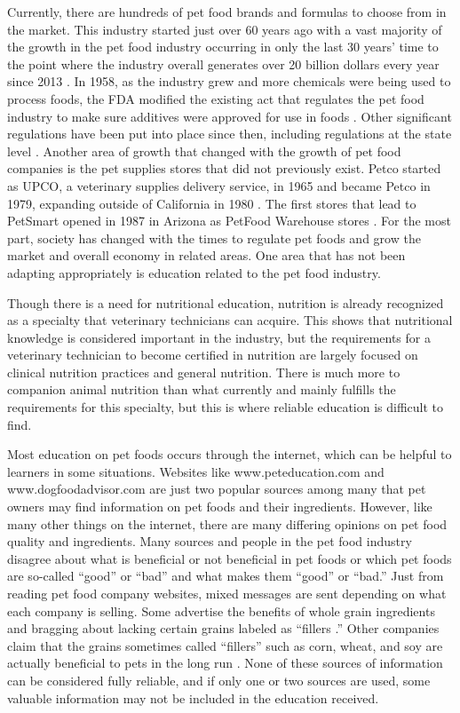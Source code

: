 Currently, there are hundreds of pet food brands and formulas to choose from in the market.  This industry started just over 60 years ago with a vast majority of the growth in the pet food industry occurring in only the last 30 years’ time to the point where the industry overall generates over 20 billion dollars every year since 2013 \citep{tudor,prweb}.  In 1958, as the industry grew and more chemicals were being used to process foods, the FDA modified the existing act that regulates the pet food industry to make sure additives were approved for use in foods \citep{fda}.  Other significant regulations have been put into place since then, including regulations at the state level \citep{fda,hillestad}.  Another area of growth that changed with the growth of pet food companies is the pet supplies stores that did not previously exist.  Petco started as UPCO, a veterinary supplies delivery service, in 1965 and became Petco in 1979, expanding outside of California in 1980 \citep{petco}. The first stores that lead to PetSmart opened in 1987 in Arizona as PetFood Warehouse stores \citep{petsmart}. For the most part, society has changed with the times to regulate pet foods and grow the market and overall economy in related areas.  One area that has not been adapting appropriately is education related to the pet food industry.
\par Though there is a need for nutritional education, nutrition is already recognized as a specialty that veterinary technicians can acquire. This shows that nutritional knowledge is considered important in the industry, but the requirements for a veterinary technician to become certified in nutrition are largely focused on clinical nutrition practices and general nutrition\citep{avnt}. There is much more to companion animal nutrition than what currently and mainly fulfills the requirements for this specialty, but this is where reliable education is difficult to find.
\par Most education on pet foods occurs through the internet, which can be helpful to learners in some situations.  Websites like www.peteducation.com and www.dogfoodadvisor.com are just two popular sources among many that pet owners may find information on pet foods and their ingredients.  However, like many other things on the internet, there are many differing opinions on pet food quality and ingredients.  Many sources and people in the pet food industry disagree about what is beneficial or not beneficial in pet foods or which pet foods are so-called “good” or “bad” and what makes them “good” or “bad.”  Just from reading pet food company websites, mixed messages are sent depending on what each company is selling.  Some advertise the benefits of whole grain ingredients and bragging about lacking certain grains labeled as “fillers \citep{blue}.”  Other companies claim that the grains sometimes called “fillers” such as corn, wheat, and soy are actually beneficial to pets in the long run \citep{purina}.  None of these sources of information can be considered fully reliable, and if only one or two sources are used, some valuable information may not be included in the education received.


